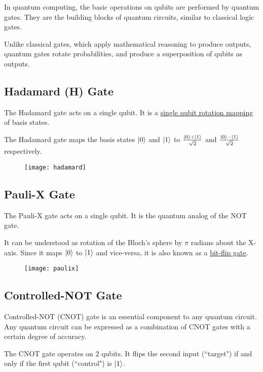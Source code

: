 \documentclass[a4paper]{article}
\begin{document}
In quantum computing, the basic operations on qubits are performed by quantum gates.
They are the building blocks of quantum circuits, similar to classical logic gates.
\\
\par
Unlike classical gates, which apply mathematical reasoning to produce outputs, 
quantum gates rotate probabilities, and produce a superposition of qubits as outputs.

\subsection{ Hadamard (H) Gate }
The Hadamard gate acts on a single qubit. It is a \underline{single qubit
rotation mapping} of basis states.
\\
\par
The Hadamard gate maps the basis states $\ket{0}$ and $\ket{1}$ to 
$ \frac{\ket{0} + \ket{1}}{\sqrt2}$ and $ \frac{\ket{0} - \ket{1}}{\sqrt2}$ 
respectively.

\begin{figure}[h]
\texttt{[image: hadamard]}
\centering
\end{figure}

\subsection{ Pauli-X Gate }
The Pauli-X gate acts on a single qubit. It is the quantum analog of the NOT gate. 
\\
\par
It can be understood as rotation of the Bloch's sphere by $\pi$ radians about the X-axis.
Since it maps $\ket{0}$ to $\ket{1}$ and vice-versa, it is also known as a
\underline{bit-flip gate}.


\begin{figure}[h]
\texttt{[image: paulix]}
\centering
\end{figure}

\subsection{ Controlled-NOT Gate }
Controlled-NOT (CNOT) gate is an essential component to any quantum circuit. Any quantum
circuit can be expressed as a combination of CNOT gates with a certain degree of 
accuracy.
\\
\par
\pagebreak
The CNOT gate operates on 2 qubits. It flips the second input (``target") if and only 
if the first qubit (``control") is $\ket{1}$.
\end{document}
